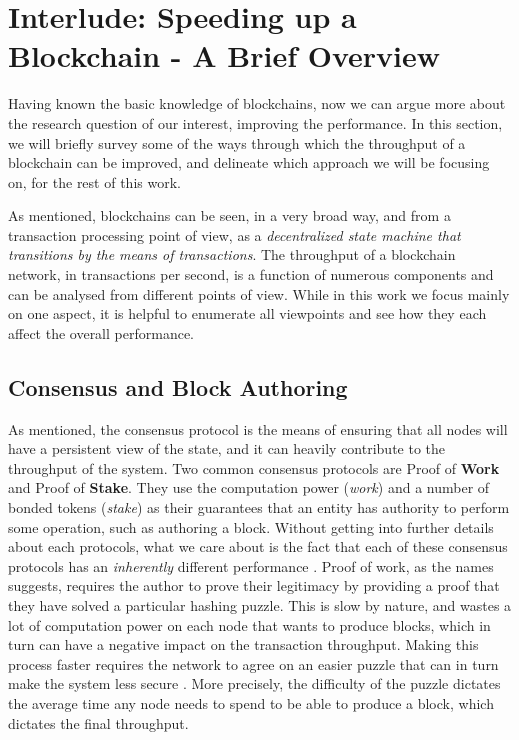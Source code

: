 \section{Interlude: Speeding up a Blockchain - A Brief Overview} \label{chap_bg:sec:ways_to_speedup}


Having known the basic knowledge of blockchains, now we can argue more about the research question
of our interest, improving the performance. In this section, we will briefly survey some of the ways
through which the throughput of a blockchain can be improved, and delineate which approach we will
be focusing on, for the rest of this work.

As mentioned, blockchains can be seen, in a very broad way, and from a transaction processing point
of view, as a \textit{decentralized state machine that transitions by the means of transactions}.
The throughput of a blockchain network, in transactions per second, is a function of numerous
components and can be analysed from different points of view. While in this work we focus mainly on
one aspect, it is helpful to enumerate all viewpoints and see how they each affect the overall
performance.

\subsection{Consensus and Block Authoring}

As mentioned, the consensus protocol is the means of ensuring that all nodes will have a persistent
view of the state, and it can heavily contribute to the throughput of the system. Two common
consensus protocols are Proof of \textbf{Work} and Proof of \textbf{Stake}. They use the computation
power (\textit{work}) and a number of bonded tokens (\textit{stake}) as their guarantees
that an entity has authority to perform some operation, such as authoring a block. Without getting
into further details about each protocols, what we care about is the fact that each of these
consensus protocols has an \textit{inherently} different performance \cite{survey_on_all}. Proof of work, as
the names suggests, requires the author to prove their legitimacy by providing a proof that they
have solved a particular hashing puzzle. This is slow by nature, and wastes a lot of computation
power on each node that wants to produce blocks, which in turn can have a negative impact on the
transaction throughput. Making this process faster requires the network to agree on an easier
puzzle that can in turn make the system less secure \cite{security_of_bitcoin}. More precisely, the
difficulty of the puzzle dictates the average time any node needs to spend to be able to produce a
block, which dictates the final throughput.

